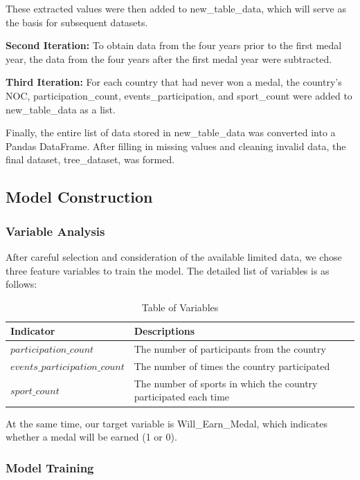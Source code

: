 \documentclass{mcmthesis}
\begin{document}
These extracted values were then added to new\_table\_data, which will serve as the basis for subsequent datasets.

{\bf Second Iteration:}
    To obtain data from the four years prior to the first medal year, the data from the four years after the first medal year were subtracted.

{\bf Third Iteration:}
    For each country that had never won a medal, the country's NOC, participation\_count, events\_participation, and sport\_count were added to new\_table\_data as a list.

    Finally, the entire list of data stored in new\_table\_data was converted into a Pandas DataFrame. After filling in missing values and cleaning invalid data, the final dataset, tree\_dataset, was formed.

\subsection{ Model Construction}

\subsubsection{Variable Analysis}
After careful selection and consideration of the available limited data, we chose three feature variables to train the model. The detailed list of variables is as follows:

    \begin{table}[h] 
        \centering  
        \caption{Table of Variables}  
        \label{tab1} 
    \begin{tabular}{ll} 
        \toprule[2pt]
        \textbf{Indicator}  & \textbf{Descriptions} \\    
        \midrule [1pt]
        $participation\_count$ & The number of participants from the country\\
        $events\_participation\_count$ & The number of times the country participated\\
        $sport\_count$   & The number of sports in which the country participated each time \\
        \bottomrule[2pt]
    \end{tabular}
    \end{table}

    At the same time, our target variable is Will\_Earn\_Medal, which indicates whether a medal will be earned (1 or 0).

\subsubsection{Model Training}
   
\end{document}
